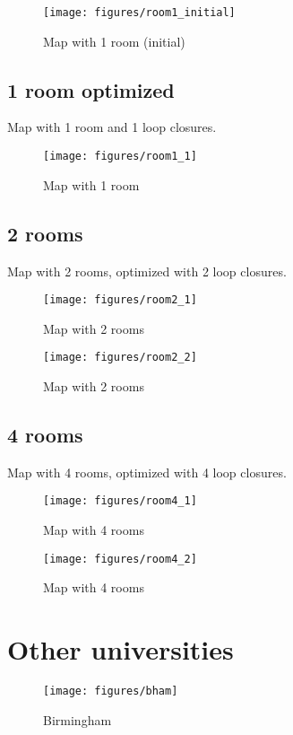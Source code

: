 \documentclass[a4paper,11pt]{kth-mag}
\begin{document}
\begin{figure}[h]
\centering
\texttt{[image: figures/room1\_initial]}
\caption{Map with 1 room (initial)}
\end{figure}

\subsection{1 room optimized}
Map with 1 room and 1 loop closures.

\begin{figure}[h]
\centering
\texttt{[image: figures/room1\_1]}
\caption{Map with 1 room}
\end{figure}

\subsection{2 rooms}
Map with 2 rooms, optimized with 2 loop closures.

\begin{figure}[h]
\centering
\texttt{[image: figures/room2\_1]}
\caption{Map with 2 rooms}
\end{figure}

\begin{figure}[h]
\centering
\texttt{[image: figures/room2\_2]}
\caption{Map with 2 rooms}
\end{figure}

\subsection{4 rooms}
Map with 4 rooms, optimized with 4 loop closures.

\begin{figure}[h]
\centering
\texttt{[image: figures/room4\_1]}
\caption{Map with 4 rooms}
\end{figure}

\begin{figure}[h]
\centering
\texttt{[image: figures/room4\_2]}
\caption{Map with 4 rooms}
\end{figure}

\section{Other universities}

\begin{figure}[h]
\centering
\texttt{[image: figures/bham]}
\caption{Birmingham}
\end{figure}
\end{document}
